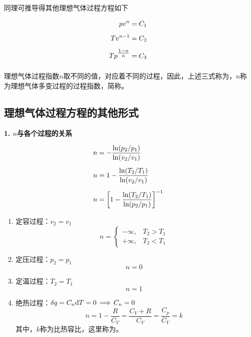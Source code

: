\noindent 同理可推导得其他理想气体过程方程如下
\begin{itemizea}
	\item\vspace*{-1em}
	\begin{align}
		pv^n &= C_1\\[0.5em]
		T v^{n-1} &= C_2\\[0.5em]
		Tp^{\textstyle \frac{1-n}{n}} &= C_3\\[-1em]\notag
	\end{align}
\end{itemizea}

理想气体过程指数$n$取不同的值，对应着不同的过程，因此，上述三式称为，$n$称为理想气体多变过程的过程指数，简称。

\vspace{1em}

\subsection{理想气体过程方程的其他形式}
\noindent \textbf{1. $n$与各个过程的关系}
\begin{itemizea}
	\item \vspace*{-0.5em}
	\begin{align}
		n &= - \frac{\ln (p_2 / p_1)}{\ln (v_2 / v_1)}\\[0.5em]
		n &= 1 - \frac{\ln(T_2 / T_1)}{\ln (v_2 / v_1)}\\[0.5em]
		n & = \left[1 - \frac{\ln (T_2 / T_1)}{\ln (p_2 / p_1)}\right]^{-1}\\[-1.5em]\notag
	\end{align}
\end{itemizea}
\begin{enumerate}[(1) ]
	\item 定容过程：$v_2 = v_1$
		\begin{equation*}
			n = 
			\begin{cases}
				- \infty, &T_2 > T_1\\
				+ \infty, & T_2 < T_1
			\end{cases}
		\end{equation*}
	\item 定压过程：$p_2 = p_1$
		\begin{equation*}
			n = 0
		\end{equation*}
\item 定温过程：$T_2 = T_1$
	\begin{equation*}
		n = 1
	\end{equation*}
\item 绝热过程：$\delta q = C_n {\rm{d}} T = 0 \, \Longrightarrow \, C_n = 0$
	\begin{equation*}
		n = 1 - \frac{R}{C_V} = \frac{C_V + R}{C_V} = \frac{C_p}{C_V} = k
	\end{equation*}
\hspace*{2em}其中，$k$称为比热容比，这里称为。
\end{enumerate}

